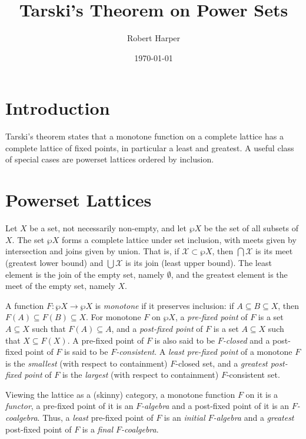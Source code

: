 \documentclass[11pt,twoside]{article}
\begin{document}
\title{Tarski's Theorem on Power Sets}
\author{Robert Harper}
\date{\today}

\maketitle{}

\section{Introduction}

Tarski's theorem states that a monotone function on a complete lattice has a complete
lattice of fixed points, in particular a least and greatest. A useful class of special
cases are powerset lattices ordered by inclusion.

\section{Powerset Lattices}

Let $X$ be a set, not necessarily non-empty, and let $\wp{X}$ be the set of all subsets of
$X$. The set $\wp{X}$ forms a complete lattice under set inclusion, with meets given by
intersection and joins given by union. That is, if $\mathcal{X}\subset\wp{X}$, then
$\bigcap{\mathcal{X}}$ is its meet (greatest lower bound) and $\bigcup{\mathcal{X}}$ is
its join (least upper bound). The least element is the join of the empty set, namely
$\emptyset$, and the greatest element is the meet of the empty set, namely $X$.

A function $F:\wp{X}\to\wp{X}$ is \emph{monotone} if it preserves inclusion: if
$A\subseteq B\subseteq X$, then $F(A)\subseteq F(B)\subseteq X$. For monotone $F$ on
$\wp{X}$, a \emph{pre-fixed point} of $F$ is a set $A\subseteq X$ such that $F(A)\subseteq
A$, and a \emph{post-fixed point} of $F$ is a set $A\subseteq X$ such that $X\subseteq
F(X)$. A pre-fixed point of $F$ is also said to be \emph{$F$-closed} and a post-fixed
point of $F$ is said to be \emph{$F$-consistent}. A \emph{least pre-fixed point} of a
monotone $F$ is the \emph{smallest} (with respect to containment) $F$-closed set, and a
\emph{greatest post-fixed point} of $F$ is the \emph{largest} (with respect to
containment) $F$-consistent set.

Viewing the lattice as a (skinny) category, a monotone function $F$ on it is a
\emph{functor}, a pre-fixed point of it is an \emph{$F$-algebra} and a post-fixed point of
it is an \emph{$F$-coalgebra}. Thus, a \emph{least} pre-fixed point of $F$ is an
\emph{initial $F$-algebra} and a \emph{greatest} post-fixed point of $F$ is a \emph{final
$F$-coalgebra}.
\end{document}

